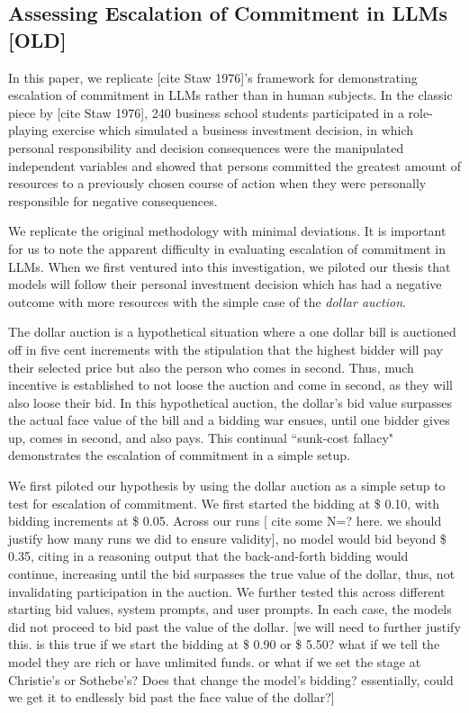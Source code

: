 \documentclass{article}
\begin{document}
\subsection{Assessing Escalation of Commitment in LLMs [OLD]}

In this paper, we replicate [cite Staw 1976]'s framework for demonstrating escalation of commitment in LLMs rather than in human subjects. In the classic piece by [cite Staw 1976], 240 business school students participated in a role-playing exercise which simulated a business investment decision, in which personal responsibility and decision consequences were the manipulated independent variables and showed that persons committed the greatest amount of resources to a previously chosen course of action when they were personally responsible for negative consequences.

We replicate the original methodology with minimal deviations. It is important for us to note the apparent difficulty in evaluating escalation of commitment in LLMs. When we first ventured into this investigation, we piloted our thesis that models will follow their personal investment decision which has had a negative outcome with more resources with the simple case of the \textit{dollar auction}.

The dollar auction is a hypothetical situation where a one dollar bill is auctioned off in five cent increments with the stipulation that the highest bidder will pay their selected price but also the person who comes in second. Thus, much incentive is established to not loose the auction and come in second, as they will also loose their bid. In this hypothetical auction, the dollar's bid value surpasses the actual face value of the bill and a bidding war ensues, until one bidder gives up, comes in second, and also pays. This continual ``sunk-cost fallacy" demonstrates the escalation of commitment in a simple setup.

We first piloted our hypothesis by using the dollar auction as a simple setup to test for escalation of commitment. We first started the bidding at \$ 0.10, with bidding increments at \$ 0.05. Across our runs [ cite some N=? here. we should justify how many runs we did to ensure validity], no model would bid beyond \$ 0.35, citing in a reasoning output that the back-and-forth bidding would continue, increasing until the bid surpasses the true value of the dollar, thus, not invalidating participation in the auction. We further tested this across different starting bid values, system prompts, and user prompts. In each case, the models did not proceed to bid past the value of the dollar. [we will need to further justify this. is this true if we start the bidding at \$ 0.90 or \$ 5.50? what if we tell the model they are rich or have unlimited funds. or what if we set the stage at Christie's or Sothebe's? Does that change the model's bidding? essentially, could we get it to endlessly bid past the face value of the dollar?]
\end{document}
